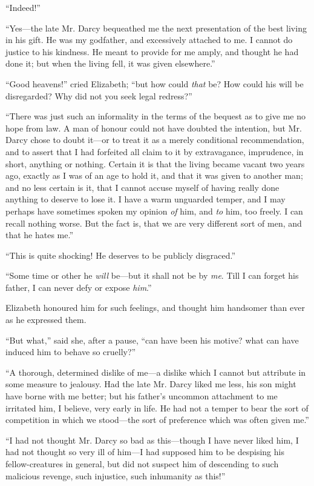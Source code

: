 \documentclass[12pt]{book}
\begin{document}
``Indeed!''

``Yes---the late Mr. Darcy bequeathed me the next presentation of the best living in his gift. He was my godfather, and excessively attached to me. I cannot do justice to his kindness. He meant to provide for me amply, and thought he had done it; but when the living fell, it was given elsewhere.''

``Good heavens!'' cried Elizabeth; ``but how could \textit{that} be? How could his will be disregarded? Why did not you seek legal redress?''

``There was just such an informality in the terms of the bequest as to give me no hope from law. A man of honour could not have doubted the intention, but Mr. Darcy chose to doubt it---or to treat it as a merely conditional recommendation, and to assert that I had forfeited all claim to it by extravagance, imprudence, in short, anything or nothing. Certain it is that the living became vacant two years ago, exactly as I was of an age to hold it, and that it was given to another man; and no less certain is it, that I cannot accuse myself of having really done anything to deserve to lose it. I have a warm unguarded temper, and I may perhaps have sometimes spoken my opinion \textit{of} him, and \textit{to} him, too freely. I can recall nothing worse. But the fact is, that we are very different sort of men, and that he hates me.''

``This is quite shocking! He deserves to be publicly disgraced.''

``Some time or other he \textit{will} be---but it shall not be by \textit{me}. Till I can forget his father, I can never defy or expose \textit{him}.''

Elizabeth honoured him for such feelings, and thought him handsomer than ever as he expressed them.

``But what,'' said she, after a pause, ``can have been his motive? what can have induced him to behave so cruelly?''

``A thorough, determined dislike of me---a dislike which I cannot but attribute in some measure to jealousy. Had the late Mr. Darcy liked me less, his son might have borne with me better; but his father's uncommon attachment to me irritated him, I believe, very early in life. He had not a temper to bear the sort of competition in which we stood---the sort of preference which was often given me.''

``I had not thought Mr. Darcy so bad as this---though I have never liked him, I had not thought so very ill of him---I had supposed him to be despising his fellow-creatures in general, but did not suspect him of descending to such malicious revenge, such injustice, such inhumanity as this!''
\end{document}
